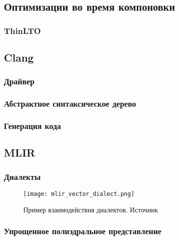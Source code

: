 \subsection{Оптимизации во время компоновки}
\subsubsection{ThinLTO}

\subsection{Clang}
\subsubsection{Драйвер}
\subsubsection{Абстрактное синтаксическое дерево}
\subsubsection{Генерация кода}

\subsection{MLIR}
\subsubsection{Диалекты}
\begin{figure}[h]
    \centering
    \texttt{[image: mlir\_vector\_dialect.png]}
    \caption{Пример взаимодействия диалектов. Источник 
    }
    \label{fig:mlir_vector_dialect}
\end{figure}
\subsubsection{Упрощенное полиэдральное представление}
